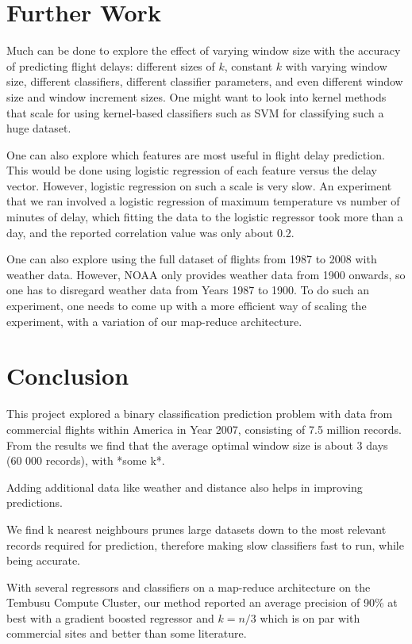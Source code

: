 \documentclass[letterpaper,11pt]{article}
\begin{document}
\section{Further Work}
Much can be done to explore the effect of varying window size with the accuracy of predicting flight delays: different sizes of $k$, constant $k$ with varying window size, different classifiers, different classifier parameters, and even different window size and window increment sizes. One might want to look into kernel methods that scale for using kernel-based classifiers such as SVM for classifying such a huge dataset. 

One can also explore which features are most useful in flight delay prediction. This would be done using logistic regression of each feature versus the delay vector. However, logistic regression on such a scale is very slow. An experiment that we ran involved a logistic regression of maximum temperature vs number of minutes of delay, which fitting the data to the logistic regressor took more than a day, and the reported correlation value was only about 0.2. 

One can also explore using the full dataset of flights from 1987 to 2008 with weather data. However, NOAA only provides weather data from 1900 onwards, so one has to disregard weather data from Years 1987 to 1900. To do such an experiment, one needs to come up with a more efficient way of scaling the experiment, with a variation of our map-reduce architecture.

\section{Conclusion}
This project explored a binary classification prediction problem with data from commercial flights within America in Year 2007, consisting of 7.5 million records. From the results we find that the average optimal window size is about 3 days (60 000 records), with *some k*.

Adding additional data like weather and distance also helps in improving predictions.

We find k nearest neighbours prunes large datasets down to the most relevant records required for prediction, therefore making slow classifiers fast to run, while being accurate.

With several regressors and classifiers on a map-reduce architecture on the Tembusu Compute Cluster, our method reported an average precision of 90\% at best with a gradient boosted regressor and $k=n/3$ which is on par with commercial sites and better than some literature.



\end{document}
